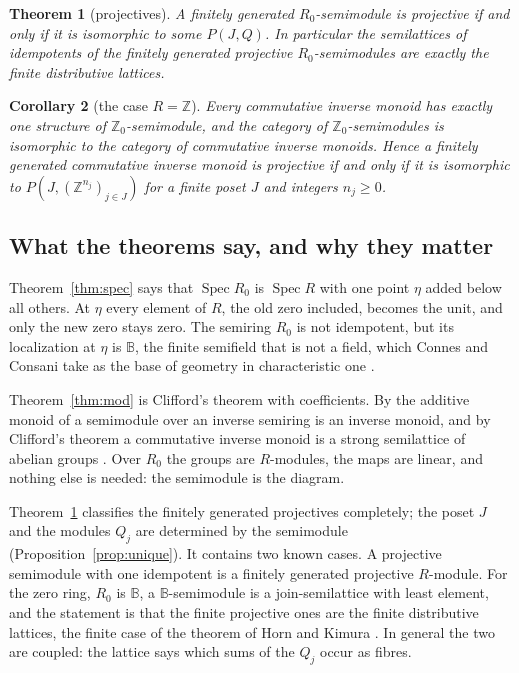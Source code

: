 \documentclass[11pt]{amsart}
\newtheorem{theorem}{Theorem}
\newtheorem{maincor}[theorem]{Corollary}
\theoremstyle{remark}
\newcommand{\B}{\mathbb B}
\DeclareMathOperator{\Spec}{Spec}
\begin{document}
\begin{theorem}[projectives]\label{thm:proj}
A finitely generated $R_0$-semimodule is projective if and only if it is isomorphic to some $P(J,Q)$. In particular the semilattices of idempotents of the finitely generated projective $R_0$-semimodules are exactly the finite distributive lattices.
\end{theorem}

\begin{maincor}[the case $R=\mathbb Z$]\label{cor:Z}
Every commutative inverse monoid has exactly one structure of $\mathbb Z_0$-semimodule, and the category of $\mathbb Z_0$-semimodules is isomorphic to the category of commutative inverse monoids. Hence a finitely generated commutative inverse monoid is projective if and only if it is isomorphic to $P(J,(\mathbb Z^{n_j})_{j\in J})$ for a finite poset $J$ and integers $n_j\ge0$.
\end{maincor}

\subsection{What the theorems say, and why they matter}
Theorem~\ref{thm:spec} says that $\Spec R_0$ is $\Spec R$ with one point $\eta$ added below all others. At $\eta$ every element of $R$, the old zero included, becomes the unit, and only the new zero stays zero. The semiring $R_0$ is not idempotent, but its localization at $\eta$ is $\B$, the finite semifield that is not a field, which Connes and Consani take as the base of geometry in characteristic one \cite{CCs,CC}.

Theorem~\ref{thm:mod} is Clifford's theorem with coefficients. By \cite[Proposition 6.1]{FGJM} the additive monoid of a semimodule over an inverse semiring is an inverse monoid, and by Clifford's theorem a commutative inverse monoid is a strong semilattice of abelian groups \cite{Clifford}. Over $R_0$ the groups are $R$-modules, the maps are linear, and nothing else is needed: the semimodule is the diagram.

Theorem~\ref{thm:proj} classifies the finitely generated projectives completely; the poset $J$ and the modules $Q_j$ are determined by the semimodule (Proposition~\ref{prop:unique}). It contains two known cases. A projective semimodule with one idempotent is a finitely generated projective $R$-module. For the zero ring, $R_0$ is $\B$, a $\B$-semimodule is a join-semilattice with least element, and the statement is that the finite projective ones are the finite distributive lattices, the finite case of the theorem of Horn and Kimura \cite{HK}. In general the two are coupled: the lattice says which sums of the $Q_j$ occur as fibres.
\end{document}
